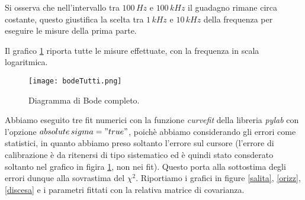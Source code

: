 \documentclass[10pt,a4paper]{article}
\begin{document}
Si osserva che nell'intervallo tra $100\,Hz$ e $100\,kHz$ il guadagno rimane circa costante, questo giustifica la scelta tra $1 \, kHz$ e $10 \, kHz$ della frequenza per eseguire le misure della prima parte.

Il grafico \ref{tutteBode} riporta tutte le misure effettuate, con la frequenza in scala logaritmica.

\begin{figure}[!htb]
\centering
  \texttt{[image: bodeTutti.png]}
\caption{Diagramma di Bode completo.}
\label{tutteBode}
\end{figure}


Abbiamo eseguito tre fit numerici con la funzione \emph{curvefit} della libreria \emph{pylab} con l'opzione \emph{$absolute\,sigma = "true"$}, poichè abbiamo considerando gli errori come statistici, in quanto abbiamo preso soltanto l'errore sul cursore (l'errore di calibrazione è da ritenersi di tipo sistematico ed è quindi stato consderato soltanto nel grafico in figira \ref{tutteBode}, non nei fit). Questo porta alla sottostima degli errori dunque alla sovrastima del $\chi^2$. Riportiamo i grafici in figure \ref{salita}, \ref{orizz}, \ref{discesa} e i parametri fittati con la relativa matrice di covarianza.
\end{document}
